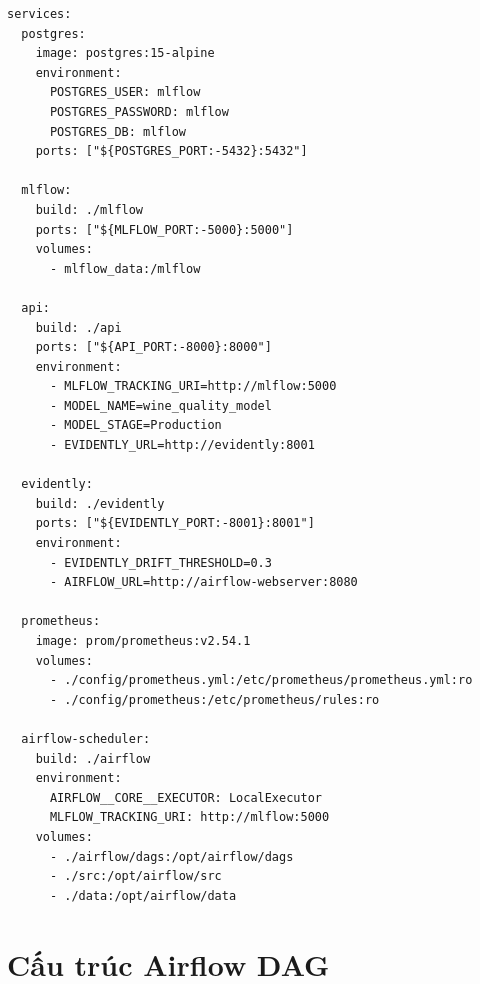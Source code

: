 \documentclass[12pt,a4paper]{report}
\begin{document}
\begin{lstlisting}[style=yaml, caption=Trích đoạn docker-compose.yml (services chính)]
services:
  postgres:
    image: postgres:15-alpine
    environment:
      POSTGRES_USER: mlflow
      POSTGRES_PASSWORD: mlflow
      POSTGRES_DB: mlflow
    ports: ["${POSTGRES_PORT:-5432}:5432"]

  mlflow:
    build: ./mlflow
    ports: ["${MLFLOW_PORT:-5000}:5000"]
    volumes:
      - mlflow_data:/mlflow

  api:
    build: ./api
    ports: ["${API_PORT:-8000}:8000"]
    environment:
      - MLFLOW_TRACKING_URI=http://mlflow:5000
      - MODEL_NAME=wine_quality_model
      - MODEL_STAGE=Production
      - EVIDENTLY_URL=http://evidently:8001

  evidently:
    build: ./evidently
    ports: ["${EVIDENTLY_PORT:-8001}:8001"]
    environment:
      - EVIDENTLY_DRIFT_THRESHOLD=0.3
      - AIRFLOW_URL=http://airflow-webserver:8080

  prometheus:
    image: prom/prometheus:v2.54.1
    volumes:
      - ./config/prometheus.yml:/etc/prometheus/prometheus.yml:ro
      - ./config/prometheus:/etc/prometheus/rules:ro

  airflow-scheduler:
    build: ./airflow
    environment:
      AIRFLOW__CORE__EXECUTOR: LocalExecutor
      MLFLOW_TRACKING_URI: http://mlflow:5000
    volumes:
      - ./airflow/dags:/opt/airflow/dags
      - ./src:/opt/airflow/src
      - ./data:/opt/airflow/data
\end{lstlisting}

\chapter{Cấu trúc Airflow DAG}
\end{document}
